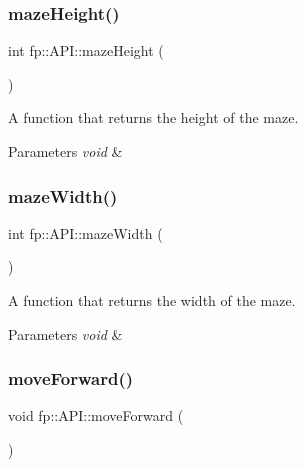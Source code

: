 \subsubsection{\texorpdfstring{maze\+Height()}{mazeHeight()}}
{\footnotesize\ttfamily int fp\+::\+A\+P\+I\+::maze\+Height (\begin{DoxyParamCaption}{ }\end{DoxyParamCaption})\hspace{0.3cm}{\ttfamily [static]}}

A function that returns the height of the maze. 
\begin{DoxyParams}{Parameters}
{\em void} & \\
\hline
\end{DoxyParams}
\mbox{\label{classfp_1_1_a_p_i_af8adb8d6fe6b921de4172111b32fc710}} 
\subsubsection{\texorpdfstring{maze\+Width()}{mazeWidth()}}
{\footnotesize\ttfamily int fp\+::\+A\+P\+I\+::maze\+Width (\begin{DoxyParamCaption}{ }\end{DoxyParamCaption})\hspace{0.3cm}{\ttfamily [static]}}

A function that returns the width of the maze. 
\begin{DoxyParams}{Parameters}
{\em void} & \\
\hline
\end{DoxyParams}
\mbox{\label{classfp_1_1_a_p_i_a4863c0dec23d677c5eefb7c03088b29c}} 
\subsubsection{\texorpdfstring{move\+Forward()}{moveForward()}}
{\footnotesize\ttfamily void fp\+::\+A\+P\+I\+::move\+Forward (\begin{DoxyParamCaption}{ }\end{DoxyParamCaption})\hspace{0.3cm}{\ttfamily [static]}}

